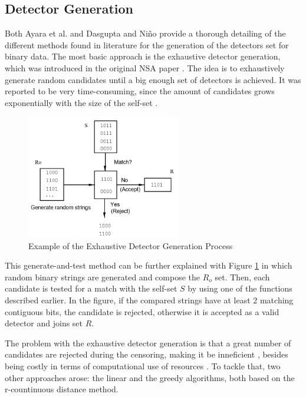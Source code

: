 \subsection{Detector Generation} \label{sec:bgNSADetectors}


Both Ayara et al. \cite{NSADetectorGen2002} and Dasgupta and Niño \cite{ICBook2009} provide a thorough detailing of the different methods found in literature for the generation of the detectors set for binary data. The most basic approach is the exhaustive detector generation, which was introduced in the original NSA paper \cite{Forrest1994}. The idea is to exhaustively generate random candidates until a big enough set of detectors is achieved. It was reported to be very time-consuming, since the amount of candidates grows exponentially with the size of the self-set \cite{LinearNSA1996}.

\begin{figure}[!h]
	\centering
	\includegraphics[width=0.6\textwidth, keepaspectratio]{img/exhaustiveNSA.png}
	\caption{Example of the Exhaustive Detector Generation Process~ \cite{LinearNSA1996} }
	\label{fig:ExhDet}
\end{figure}

This generate-and-test method can be further explained with Figure \ref{fig:ExhDet} in which random binary strings are generated and compose the \(R_o\) set. Then, each candidate is tested for a match with the self-set \(S\) by using one of the functions described earlier. In the figure, if the compared strings have at least 2 matching contiguous bits, the candidate is rejected, otherwise it is accepted as a valid detector and joins set \(R\).

The problem with the exhaustive detector generation is that a great number of candidates are rejected during the censoring, making it be inneficient \cite{NSADetGen1996}, besides being costly in terms of computational use of resources \cite{NSADetectorGen2002}. To tackle that, two other approaches arose: the linear and the greedy algorithms, both based on the r-countinuous distance method. 

